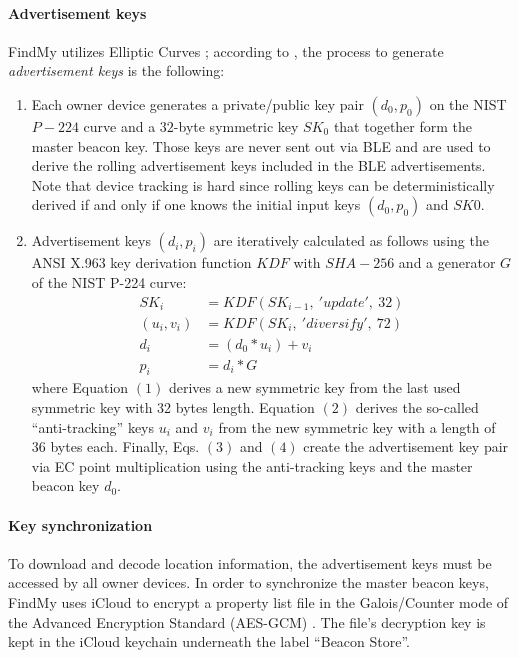 \documentclass[english]{article}
\begin{document}
\paragraph{Advertisement keys}\label{keys}
FindMy utilizes Elliptic Curves \cite{ec}; according to \cite{aps,whocanfind}, the process to generate \textit{advertisement keys} is the following:
\begin{enumerate}
  \item Each owner device generates a private/public key pair
  $(d_0, p_0)$ on the NIST $P-224$ curve and a $32$-byte symmetric key $SK_0$ that together form the master beacon key. Those keys are never sent out via BLE and are used to derive the rolling advertisement keys included in the BLE advertisements. Note that device tracking is hard since rolling keys can be deterministically derived if and only if one knows the initial input keys $(d_0, p_0)$ and $SK0$.
  \item Advertisement keys $(d_i,p_i)$ are iteratively calculated as follows using the ANSI X.963 key derivation function $KDF$ \cite{ANSI} with $SHA-256$ \cite{sha} and a generator $G$ of the NIST P-224 curve:
  \begin{align}
    SK_i &= KDF(SK_{i-1},\ 'update',\ 32) \\
    (u_i, v_i) &= KDF(SK_i,\ 'diversify',\ 72) \\
    d_i &= (d_0 * u_i) + v_i \\
    p_i &= d_i * G
  \end{align}
  where Equation $(1)$ derives a new symmetric key from the last used symmetric key with 32 bytes length. Equation $(2)$ derives the so-called “anti-tracking” keys $u_i$ and $v_i$ from the new symmetric key with a length of $36$ bytes each. Finally, Eqs. $(3)$ and $(4)$ create the advertisement key pair via EC point multiplication using the anti-tracking keys and the master beacon key $d_0$.
\end{enumerate}

\paragraph{Key synchronization}
To download and decode location information, the advertisement keys must be accessed by all owner devices. In order to synchronize the master beacon keys, FindMy uses iCloud to encrypt a property list file in the Galois/Counter mode of the Advanced Encryption Standard (AES-GCM) \cite{gcm}. The file's decryption key is kept in the iCloud keychain underneath the label “Beacon Store”.
\end{document}
